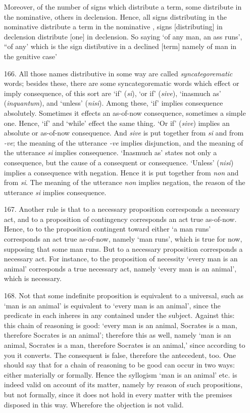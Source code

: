 \documentclass[]{article}
\begin{document}
\begin{itemize}
Moreover, of the number of signs which distribute a term, some distribute in the nominative, others in declension. Hence, all signs distributing in the nominative distribute a term in the nominative , signs [distributing] in declension distribute [one] in declension. So saying `of any man, an ass runs', ``of any' which is the sign distibutive in a declined [term] namely of man in the genitive case'
\item[166.] All those names distributive in some way are called \textit{syncategorematic} words; besides these, there are some syncategorematic words which effect or imply consequence, of this sort are `if' (\textit{si}), `or if' (\textit{sive}), `inasmuch as' (\textit{inquantum}), and `unless' (\textit{nisi}). Among these, `if' implies consequence absolutely. Sometimes it effects an as-of-now consequence, sometimes a simple one. Hence, `if' and `while'  effect the same thing.  `Or if' (\textit{sive}) implies an absolute or as-of-now consequence. And \textit{sive} is put together from \textit{si} and from \textit{-ve}; the meaning of the utterance \textit{-ve} implies disjunction, and the meaning of the utterance \textit{si} implies consequence. `Inasmuch as' states not only a consequence, but the cause of a consequent or consequence. `Unless' (\textit{nisi}) implies a consequence with negation. Hence it is put together from \textit{non} and from \textit{si}. The meaning of the utterance \textit{non} implies negation, the reason of the utterance \textit{si} implies consequence.
\item[167.] Another rule is that to a necessary proposition corresponds a necessary act, and to a proposition of contingency corresponds an act true as-of-now. Hence, to to the proposition contingent toward either `a man runs' corresponds an act true as-of-now, namely `man runs', which is true for now, supposing that some man runs. But to a necessary proposition corresponds a necessary act. For instance, to the proposition of necessity `every man is an animal' corresponds a true necessary act, namely `every man is an animal', which is necessary.
\item[168.] Not that some indefinite proposition is equivalent to a universal, such as `man is an animal' is equivalent to `every man is an animal', since the predicate in each inheres in any contained under the subject. Against this: this chain of reasoning is good: `every man is an animal, Socrates is a man, therefore Socrates is an animal'; therefore this as well, namely `man is an animal, Socrates is a man, therefore Socrates is an animal,' since according to you it converts. The consequent is false, therefore the antecedent, too. One should say that for a chain of reasoning to be good can occur in two ways: either materially or formally. Hence the syllogism `man is an animal' etc. is indeed valid on account of its matter, namely by reason of such propositions, but not formally, since it does not hold in every matter with the premises disposed in this way. Wherefore the objection is not valid.

\end{itemize}
\end{document}
